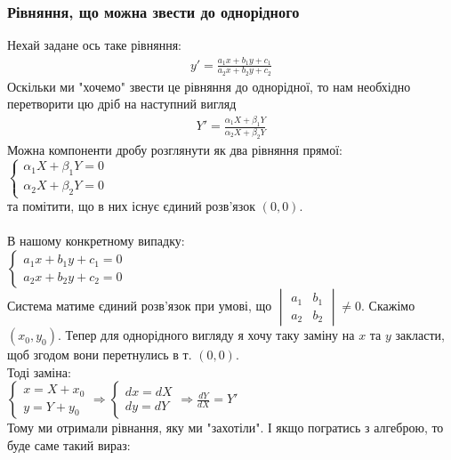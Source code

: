 \documentclass[a4paper, 14pt]{extarticle}
\def\huge{\displaystyle}
\begin{document}
	\subsubsection{Рівняння, що можна звести до однорідного}
	Нехай задане ось таке рівняння:
	\begin{align*}
	y' = \frac{a_1 x + b_1 y + c_1}{a_2 x + b_2 y + c_2}
	\end{align*}
	Оскільки ми "хочемо" \hspace{0.1cm} звести це рівняння до однорідної, то нам необхідно перетворити цю дріб на наступний вигляд
	\begin{align*}
	Y' = \frac{\alpha_1 X + \beta_1 Y}{\alpha_2 X + \beta_2 Y}
	\end{align*}
	Можна компоненти дробу розглянути як два рівняння прямої:\\
	$\begin{cases}
	\alpha_1 X + \beta_1 Y = 0\\
	\alpha_2 X + \beta_2 Y = 0
	\end{cases}
	$\\
	та помітити, що в них існує єдиний розв'язок $(0,0)$.\\ \\
	В нашому конкретному випадку:\\
	$\begin{cases}
	a_1 x + b_1 y + c_1 = 0\\
	a_2 x + b_2 y + c_2 = 0
	\end{cases}
	$\\
	Система матиме єдиний розв'язок при умові, що $\begin{vmatrix} a_1 & b_1 \\ a_2 & b_2 \end{vmatrix} \neq 0$. Скажімо $(x_0, y_0)$. Тепер для однорідного вигляду я хочу таку заміну на $x$ та $y$ закласти, щоб згодом вони перетнулись в т. $(0,0)$.\\
	Тоді заміна:\\
	$\begin{cases}
	x = X + x_0\\
	y = Y + y_0
	\end{cases} \Rightarrow
	\begin{cases}
	dx = dX\\
	dy = dY
	\end{cases}
	\Rightarrow \huge \frac{dY}{dX} = Y'
	$\\
	Тому ми отримали рівнання, яку ми "захотіли". І якщо погратись з алгеброю, то буде саме такий вираз:\\
\end{document}

